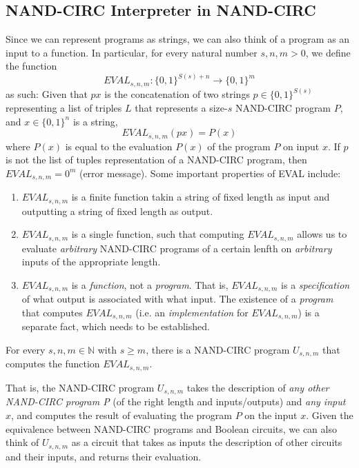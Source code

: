 \documentclass{article}
\begin{document}
  \subsection{NAND-CIRC Interpreter in NAND-CIRC}
  Since we can represent programs as strings, we can also think of a program as an input to a function. In particular, for every natural number $s, n, m > 0$, we define the function
  \[EVAL_{s, n, m} : \{0,1\}^{S(s) + n} \longrightarrow \{0,1\}^m\]
  as such: Given that $px$ is the concatenation of two strings $p \in \{0,1\}^{S(s)}$ representing a list of triples $L$ that represents a size-$s$ NAND-CIRC program $P$, and $x \in \{0,1\}^n$ is a string, 
  \[EVAL_{s, n, m} (px) = P(x)\]
  where $P(x)$ is equal to the evaluation $P(x)$ of the program $P$ on input $x$. If $p$ is not the list of tuples representation of a NAND-CIRC program, then $EVAL_{s, n, m} = 0^m$ (error message). Some important properties of EVAL include: 
  \begin{enumerate}
      \item $EVAL_{s, n, m}$ is a finite function takin a string of fixed length as input and outputting a string of fixed length as output. 
      \item $EVAL_{s, n, m}$ is a single function, such that computing $EVAL_{s, n, m}$ allows us to evaluate \textit{arbitrary} NAND-CIRC programs of a certain lenfth on \textit{arbitrary} inputs of the appropriate length. 
      \item $EVAL_{s, n, m}$ is a \textit{function}, not a \textit{program}. That is, $EVAL_{s, n, m}$ is a \textit{specification} of what output is associated with what input. The existence of a \textit{program} that computes $EVAL_{s, n, m}$ (i.e. an \textit{implementation} for $EVAL_{s, n, m}$) is a separate fact, which needs to be established. 
  \end{enumerate}

  \begin{theorem}
  For every $s, n, m \in \mathbb{N}$ with $s \geq m$, there is a NAND-CIRC program $U_{s, n, m}$ that computes the function $EVAL_{s, n, m}$. 
  \end{theorem}

  That is, the NAND-CIRC program $U_{s, n, m}$ takes the description of \textit{any other NAND-CIRC program P} (of the right length and inputs/outputs) and \textit{any input $x$}, and computes the result of evaluating the program $P$ on the input $x$. Given the equivalence between NAND-CIRC programs and Boolean circuits, we can also think of $U_{s, n, m}$ as a circuit that takes as inputs the description of other circuits and their inputs, and returns their evaluation. 
\end{document}

